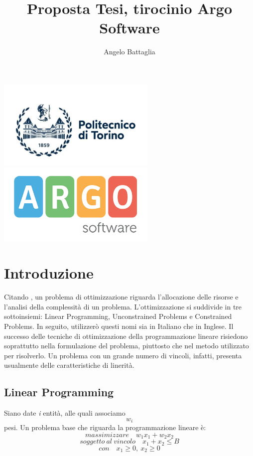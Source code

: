 \documentclass{article}
\author{Angelo Battaglia}
\title{Proposta Tesi, tirocinio Argo Software}
\begin{document}
\maketitle

\begin{center}
\includegraphics[width=3in]{polito.jpg}
\includegraphics[width=3in]{og_logoargosoft.png}
\end{center}

\section{Introduzione}

Citando \textcite{StanfordOptimization}, un problema di ottimizzazione riguarda l'allocazione
delle risorse e l'analisi della complessità di un problema. L'ottimizzazione si suddivide in tre
sottoinsiemi: Linear Programming, Unconstrained Problems e Constrained Problems. In seguito, 
utilizzerò questi nomi sia in Italiano che in Inglese. Il successo delle tecniche di ottimizzazione
della programmazione lineare risiedono soprattutto nella formulazione del problema, piuttosto che
nel metodo utilizzato per risolverlo. Un problema con un grande numero di vincoli, infatti, 
presenta usualmente delle caratteristiche di linerità.

\subsection{Linear Programming}
Siano date \textit{i} entità, alle quali associamo \textit{\[w_i\]} pesi. Un problema base che riguarda 
la programmazione lineare è: \[massimizzare \quad  w_1x_1 + w_2x_2 \]
\[soggetto \ al \ vincolo \quad x_1 + x_2 \leq B \]
\[con \quad x_1\geq 0, \ x_2 \geq 0 \]
\end{document}
